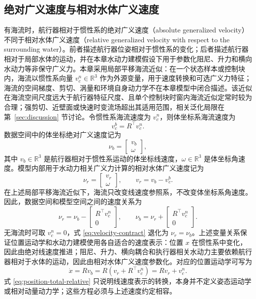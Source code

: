 \documentclass[UTF8,zihao=-4]{ctexrep}
\newcommand{\R}{\mathbb{R}}
\begin{document}
\subsection{绝对广义速度与相对水体广义速度}

有海流时，航行器相对于惯性系的绝对广义速度（absolute generalized velocity）不同于相对水体广义速度（relative generalized velocity with respect to the surrounding water）。前者描述航行器位姿相对于惯性系的变化；后者描述航行器相对于局部水体的运动，并在本章水动力建模假设下用于参数化阻尼、升力和横向水动力等非保守广义力。本章采用局部平移海流近似：在一个状态样本或控制块内，海流以惯性系向量 \(v_c^n\in\R^3\) 作为外源变量，用于速度转换和可选广义力特征；海流的空间梯度、剪切、涡量和环境自身动力学不在本章模型中闭合描述。该近似在海流空间尺度远大于航行器特征尺度、且单个控制块时窗内海流近似定常时较为合理；强剪切、近壁面或快速时变流场超出其适用范围，相关泛化局限在第~\ref{sec:discussion} 节讨论。令惯性系海流速度为 \(v_c^n\)，则体坐标系海流速度为
\begin{equation}
  v_c^b=R^\top v_c^n .
  \label{eq:body-current}
\end{equation}
数据空间中的体坐标绝对广义速度记为
\begin{equation}
  \nu_b=\begin{bmatrix}v_b\\\omega\end{bmatrix},
\end{equation}
其中 \(v_b\in\R^3\) 是航行器相对于惯性系运动的体坐标线速度，\(\omega\in\R^3\) 是体坐标角速度。模型内部用于水动力相关广义力计算的相对水体广义速度记为
\begin{equation}
  \nu_r=\begin{bmatrix}v_r\\\omega\end{bmatrix},
  \qquad
  v_r=v_b-v_c^b .
\end{equation}
在上述局部平移海流近似下，海流只改变线速度参照系，不改变体坐标系角速度。因此，数据空间和模型空间之间的速度关系为
\begin{equation}
  \nu_r=
  \nu_b-
  \begin{bmatrix}
    R^\top v_c^n\\0
  \end{bmatrix},
  \qquad
  \nu_b=
  \nu_r+
  \begin{bmatrix}
    R^\top v_c^n\\0
  \end{bmatrix}.
  \label{eq:velocity-contract}
\end{equation}
无海流时可取 \(v_c^n=0\)，式 \eqref{eq:velocity-contract} 退化为 \(\nu_r=\nu_b\)。上述变量关系保证位置运动学和水动力建模使用各自适合的速度表示：位置 \(x\) 在惯性系中变化，因此由绝对线速度推进；阻尼、升力、横向耦合和执行器相关水动力主要依赖航行器相对于水体的运动，因此由相对水体广义速度参数化。对应的位置运动学可写为
\begin{equation}
  \dot x
  =
  Rv_b
  =
  R(v_r+R^\top v_c^n)
  =
  Rv_r+v_c^n .
  \label{eq:position-total-relative}
\end{equation}
式 \eqref{eq:position-total-relative} 只说明线速度表示的转换，本身并不定义姿态运动学或相对动量动力学；这些方程必须与上述速度约定相容。
\end{document}
